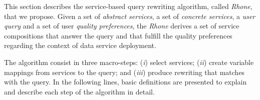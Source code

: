 This section describes the service-based query rewriting algorithm, called \textit{Rhone}, that we propose. 
%
Given a set of \textit{abstract services}, a set of \textit{concrete services}, a
\textit{user query} and a set of user \textit{quality preferences}, the \textit{Rhone} derives a set
of service compositions that answer the query and that fulfill the quality preferences regarding the 
context of data service deployment.
%

The algorithm consist in three macro-steps: 
(\textit{i}) select services; 
(\textit{ii}) create variable mappings from services to the query; and 
(\textit{iii}) produce rewriting that matches with the query. 
In the following lines, basic definitions are presented to explain and describe each step of the 
algorithm in detail. 